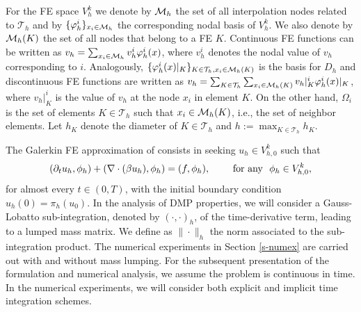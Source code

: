For the FE space $V_h^k$ we denote by $\mathcal{M}_h$ the set of all interpolation nodes related to $\mathcal{T}_h$ and by $\{\varphi^i_h\}_{x_i \in \mathcal{M}_h}$ the corresponding nodal basis of $V_h^k$. We also denote by $\mathcal{M}_h(K)$ the set of all nodes that belong to a FE $K$. Continuous FE functions can be written as $v_h = \sum_{x_i \in \mathcal{M}_h} v_h^i \varphi^i_h(x)$, where $v_h^i$ denotes the nodal value of $v_h$ corresponding to $i$. Analogously, $\{\varphi^i_h(x)|_K\}_{K \in \mathcal{T}_h, x_i \in \mathcal{M}_h(K)}$ is the basis for $D_h$ and discontinuous FE functions  are written as $v_h = \sum_{K \in \mathcal{T}_h} \sum_{x_i \in \mathcal{M}_h(K)} v_h|_K^i \varphi^i_h(x)|_K$, where $v_h|_K^i$ is the value of $v_h$ at the node $x_i$ in element $K$.  
On the other hand, $\Omega_i$ is the set of elements $K \in \mathcal{T}_h$ such that $x_i \in \mathcal{M}_h(K)$, i.e., the set of neighbor elements. Let  $h_K$ denote the diameter of $K\in\mathcal{T}_h$ and $h := \max_{K\in\mathcal{T}_h} h_K$. 

The Galerkin FE approximation of  consists in seeking $u_h \in V^k_{h,0}$ such that
\begin{equation}\label{eq-galerkin}
(\partial_t u_h,\phi_h) +   (\nabla \cdot (\beta u_h),\phi_h) =  (f , \phi_h ) , \qquad \hbox{ for any }  \ \phi_h \in V^k_{h,0}, 
\end{equation}
for almost every $t \in (0,T)$, with the initial boundary condition $u_h(0) = \pi_h(u_0)$. In the analysis of DMP properties, we will consider a Gauss-Lobatto sub-integration, denoted by $(\cdot,\cdot)_h$, of the time-derivative term, leading to a lumped mass matrix. We define as $\|\cdot \|_h$ the norm associated to the sub-integration product. The numerical experiments in Section \ref{s-numex} are carried out with and without mass lumping. For the subsequent presentation of the formulation and numerical analysis, we assume the problem is continuous in time. In the numerical experiments, we will consider both explicit and implicit time integration schemes.

